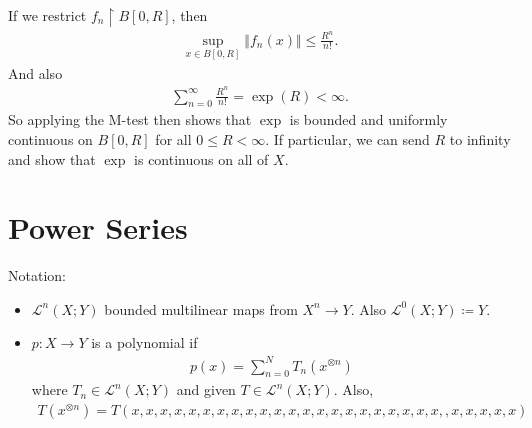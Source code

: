 \documentclass{report}
\begin{document}
\noindent If we restrict $f_n \restriction B[0, R]$, then 
\begin{align*}
    \sup_{x \in B[0, R]}\Vert f_n(x)\Vert \leq \frac{R^n}{n!}.
\end{align*}
And also 
\begin{align*}
    \sum_{n=0}^\infty \frac{R^n}{n!} = \exp(R) < \infty.
\end{align*}
So applying the M-test then shows that $\exp$ is bounded and uniformly continuous on $B[0, R]$ for all $0 \leq R < \infty$. If particular, we can send $R$ to infinity and show that $\exp$ is continuous on all of $X$.
\section{Power Series}
\noindent Notation: 
\begin{itemize}
    \item $\mathcal L^n(X; Y)$ bounded multilinear maps from $X^n \to Y$. Also $\mathcal L^0(X; Y) \coloneq Y$. 
    \item $p: X \to Y$ is a polynomial if 
    \begin{align*}
        p(x) = \sum_{n=0}^N T_n(x^{\otimes n})
    \end{align*}
    where $T_n \in \mathcal L^n(X; Y)$ and given $T \in \mathcal L^n(X; Y)$. Also,
    \begin{align*}
        T(x^{\otimes n}) = T(x, x, x, x, x, x, x, x, x ,x, x, x, x, x, x, x, x, x, x, x, x, x, , x, x, x, x, x)
    \end{align*}
\end{itemize}
\end{document}
